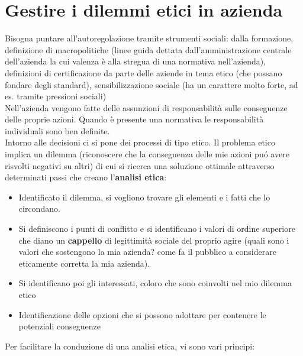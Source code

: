 \section{Gestire i dilemmi etici in azienda}
Bisogna puntare all'autoregolazione tramite strumenti sociali: dalla
formazione, definizione di macropolitiche (linee guida dettata
dall'amministrazione centrale dell'azienda la cui valenza \`e alla stregua
di una normativa nell'azienda), definizioni di certificazione da parte
delle aziende in tema etico (che possano fondare degli standard),
sensibilizzazione sociale (ha un carattere molto forte, ad es. tramite
pressioni sociali)\\
Nell'azienda vengono fatte delle assunzioni di responsabilit\`a sulle
conseguenze delle proprie azioni. Quando \`e presente una normativa le responsabilit\`a individuali sono ben definite.\\
Intorno alle decisioni ci si pone dei
processi di tipo etico. Il problema etico implica un dilemma
(riconoscere che la conseguenza delle mie azioni pu\'o avere risvolti
negativi su altri) di cui si ricerca una soluzione ottimale attraverso
determinati passi che creano l'\textbf{analisi etica}:

\begin{itemize}

\item
  Identificato il dilemma, si vogliono trovare gli elementi e i fatti
  che lo circondano.\\
\item
  Si definiscono i punti di conflitto e si identificano i valori di
  ordine superiore che diano un \textbf{cappello} di legittimit\`a sociale del
  proprio agire (quali sono i valori che sostengono la mia azienda? come
  fa il pubblico a considerare eticamente corretta la mia azienda).\\
\item
  Si identificano poi gli interessati, coloro che sono coinvolti nel mio
  dilemma etico\\
\item
  Identificazione delle opzioni che si possono adottare per contenere le
  potenziali conseguenze
\end{itemize}

Per facilitare la conduzione di una analisi etica, vi sono vari
principi:

